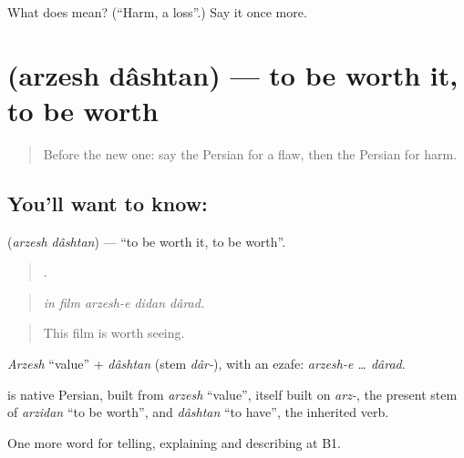 \begin{tcolorbox}[breakable,colback=teal!4,colframe=teal!35!black,title={Before you move on}]
What does  mean? (\textquotedblleft{}Harm, a loss\textquotedblright{}.) Say it once more.
\end{tcolorbox}
\section[\texorpdfstring{\fa{ارزش} \fa{داشتن} (arzesh dâshtan)}{ارزش داشتن (arzesh dâshtan)}]{  (arzesh dâshtan) — to be worth it, to be worth}

\label{lesson:FA-C375-arzesh-dashtan}



\begin{quote}
Before the new one: say the Persian for a flaw, then the Persian for harm.
\end{quote}

\subsection*{You'll want to know:  }
\textbf{ } (\emph{arzesh dâshtan}) — \textquotedblleft{}to be worth it, to be worth\textquotedblright{}.

\begin{quote}
    .
\end{quote}

\begin{quote}
\emph{in film arzesh-e didan dârad.}
\end{quote}

\begin{quote}
This film is worth seeing.
\end{quote}

\emph{Arzesh} \textquotedblleft{}value\textquotedblright{} + \emph{dâshtan} (stem \emph{dâr-}), with an ezafe: \emph{arzesh-e … dârad}.

\begin{cousinweb}
\textbf{ } is native Persian, built from \emph{arzesh} \textquotedblleft{}value\textquotedblright{}, itself built on \emph{arz-}, the present stem of \emph{arzidan} \textquotedblleft{}to be worth\textquotedblright{}, and \emph{dâshtan} \textquotedblleft{}to have\textquotedblright{}, the inherited verb.
\end{cousinweb}

\begin{grammarlens}[title={What you've built}]
One more word for telling, explaining and describing at B1.
\end{grammarlens}


